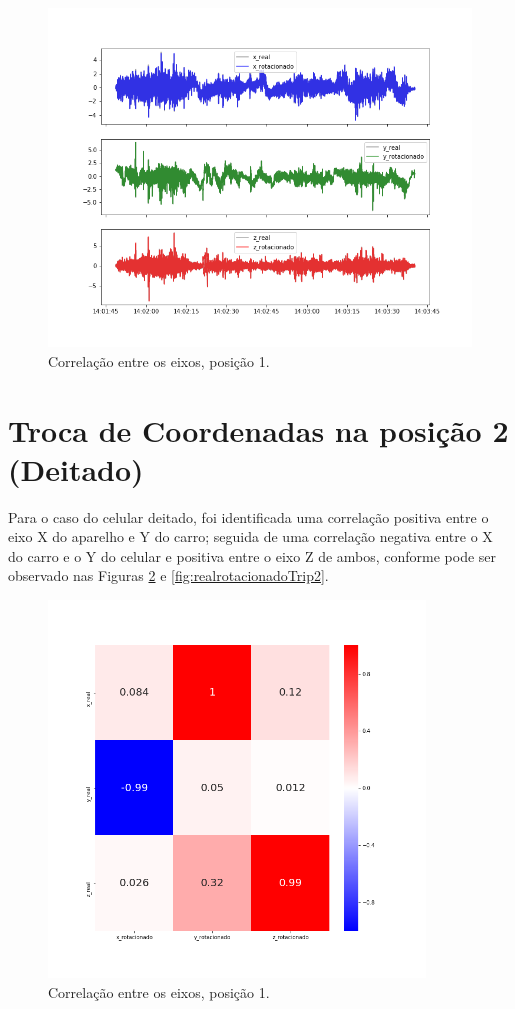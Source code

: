 \begin{figure}
    \centering
    \includegraphics[width=150mm]{Figuras/realrotacionadotrip1.png}
    \caption{Correlação entre os eixos, posição 1.}
    \label{fig:realrotacionadoTrip1}
\end{figure}{}
 
\section{Troca de Coordenadas na posição 2 (Deitado)}
Para o caso do celular deitado, foi identificada uma correlação positiva entre o eixo X do aparelho e Y do carro; seguida de uma correlação negativa entre o X do carro e o Y do celular e positiva entre o eixo Z de ambos, conforme pode ser observado nas Figuras \ref{fig:hmapTrip2} e \ref{fig:realrotacionadoTrip2}.

\begin{figure}
    \centering
    \includegraphics[width=100mm]{Figuras/hmaptrip2.png}
    \caption{Correlação entre os eixos, posição 1.}
    \label{fig:hmapTrip2}
\end{figure}{}
 
